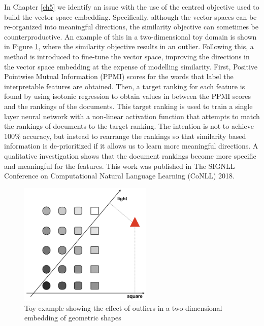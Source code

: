 In Chapter \ref{ch5} we identify an issue with the use of the  centred objective used to build the vector space embedding. Specifically, although the vector spaces can be re-organized into meaningful directions, the similarity objective can sometimes be counterproductive. An example of this in a two-dimensional toy domain is shown in Figure \ref{ch1:toyExample}, where the similarity objective results in an outlier. Following this, a method is introduced to fine-tune the vector space, improving the directions in the vector space embedding at the expense of modelling similarity. First, Positive Pointwise Mutual Information (PPMI) scores for the words that label the interpretable features are obtained. Then, a target ranking for each feature is found by using isotonic regression to obtain values in between the PPMI scores and the rankings of the documents. This target ranking is used to train a single layer neural network with a non-linear activation function that attempts to match the rankings of documents to the target ranking. The intention is not to achieve 100\% accuracy, but instead to rearrange the rankings so that similarity based information is de-prioritized if it allows us to learn more meaningful directions.  A qualitative investigation shows that the document rankings become more specific and meaningful for the features. This work was published in The SIGNLL Conference on Computational Natural Language Learning (CoNLL) 2018.

\begin{figure}
	\centering
	\includegraphics[width=180pt]{images/shapes}
	\caption{Toy example showing the effect of outliers in a two-dimensional embedding of geometric shapes}
	\label{ch1:toyExample}
\end{figure}

